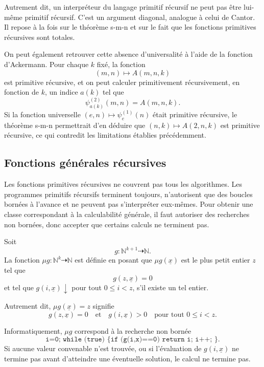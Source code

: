 Autrement dit, un interpréteur du langage primitif récursif ne peut pas
être lui-même primitif récursif.  C'est un argument diagonal, analogue
à celui de Cantor.  Il repose à la fois sur le théorème s-m-n et sur le
fait que les fonctions primitives récursives sont totales.

On peut également retrouver cette absence d'universalité à l'aide de
la fonction d'Ackermann.  Pour chaque $k$ fixé, la fonction
\[
(m,n)\mapsto A(m,n,k)
\]
est primitive récursive, et on peut calculer primitivement
récursivement, en fonction de $k$, un indice $a(k)$ tel que
\[
\psi_{a(k)}^{(2)}(m,n)=A(m,n,k).
\]
Si la fonction universelle $(e,n)\mapsto\psi_e^{(1)}(n)$ était
primitive récursive, le théorème s-m-n permettrait d'en déduire que
$(n,k)\mapsto A(2,n,k)$ est primitive récursive, ce qui contredit les
limitations établies précédemment.

\subsection{Fonctions générales récursives}
\label{subsection-general-recursive-functions}

\thingy Les fonctions primitives récursives ne couvrent pas tous les
algorithmes.  Les programmes primitifs récursifs terminent toujours,
n'autorisent que des boucles bornées à l'avance et ne peuvent pas
s'interpréter eux-mêmes.  Pour obtenir une classe correspondant à la
calculabilité générale, il faut autoriser des recherches non bornées,
donc accepter que certains calculs ne terminent pas.

\begin{defn}\label{definition-mu-operator}
Soit
\[
g\colon\mathbb{N}^{k+1}\dasharrow\mathbb{N}.
\]
La fonction $\mu g\colon\mathbb{N}^k\dasharrow\mathbb{N}$ est définie
en posant que $\mu g(\underline{x})$ est le plus petit entier $z$ tel
que
\[
g(z,\underline{x})=0
\]
et tel que $g(i,\underline{x})\downarrow$ pour tout $0\leq i<z$, s'il
existe un tel entier.

Autrement dit, $\mu g(\underline{x})=z$ signifie
\[
g(z,\underline{x})=0
\quad\text{et}\quad
g(i,\underline{x})>0
\quad\text{pour tout $0\leq i<z$}.
\]
\end{defn}

Informatiquement, $\mu g$ correspond à la recherche non bornée
\[
\texttt{i=0; while (true) \{ if (g(i,x)==0) return i; i++; \}}.
\]
Si aucune valeur convenable n'est trouvée, ou si l'évaluation de
$g(i,\underline{x})$ ne termine pas avant d'atteindre une éventuelle
solution, le calcul ne termine pas.

